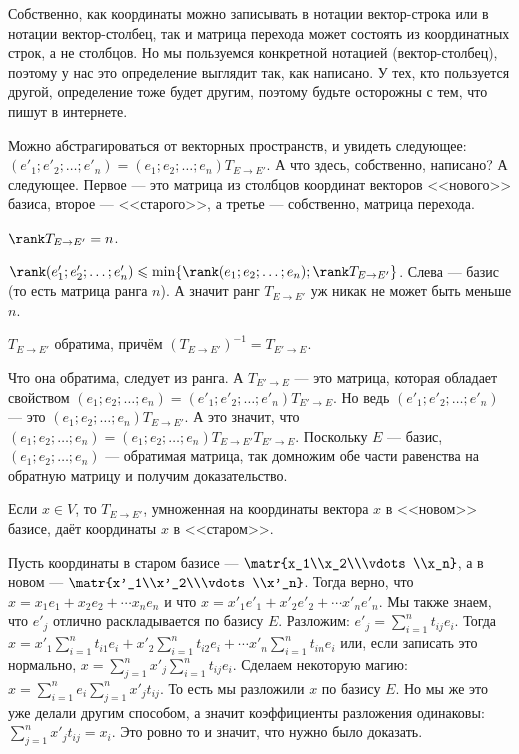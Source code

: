 \documentclass{article}
\begin{document}
\begin{itemize}
        \begin{Comment}
            Собственно, как координаты можно записывать в нотации вектор-строка или в нотации вектор-столбец, так и матрица перехода может состоять из координатных строк, а не столбцов. Но мы пользуемся конкретной нотацией (вектор-столбец), поэтому у нас это определение выглядит так, как написано. У тех, кто пользуется другой, определение тоже будет другим, поэтому будьте осторожны с тем, что пишут в интернете.
        \end{Comment}
        \begin{Comment}
            Можно абстрагироваться от векторных пространств, и увидеть следующее: $(e'_1;e'_2;\ldots;e'_n)=(e_1;e_2;\ldots;e_n)T_{E\to E'}$. А что здесь, собственно, написано? А следующее. Первое --- это матрица из столбцов координат векторов <<нового>> базиса, второе --- <<старого>>, а третье --- собственно, матрица перехода.
        \end{Comment}
        \thm $\rank T_{E\to E'}=n$.
        \begin{Proof}
            $\rank(e'_1;e'_2;\ldots;e'_n)\leqslant\min\{\rank(e_1;e_2;\ldots;e_n);\rank T_{E\to E'}\}$. Слева --- базис (то есть матрица ранга $n$). А значит ранг $T_{E\to E'}$ уж никак не может быть меньше $n$.
        \end{Proof}
        \thm $T_{E\to E'}$ обратима, причём $(T_{E\to E'})^{-1}=T_{E'\to E}$.
        \begin{Proof}
            Что она обратима, следует из ранга. А $T_{E'\to E}$ --- это матрица, которая обладает свойством $(e_1;e_2;\ldots;e_n)=(e'_1;e'_2;\ldots;e'_n)T_{E'\to E}$. Но ведь $(e'_1;e'_2;\ldots;e'_n)$ --- это $(e_1;e_2;\ldots;e_n)T_{E\to E'}$. А это значит, что $(e_1;e_2;\ldots;e_n)=(e_1;e_2;\ldots;e_n)T_{E\to E'}T_{E'\to E}$. Поскольку $E$ --- базис, $(e_1;e_2;\ldots;e_n)$ --- обратимая матрица, так домножим обе части равенства на обратную матрицу и получим доказательство.
        \end{Proof}
        \thm Если $x\in V$, то $T_{E\to E'}$, умноженная на координаты вектора $x$ в <<новом>> базисе, даёт координаты $x$ в <<старом>>.
        \begin{Proof}
            Пусть координаты в старом базисе --- $\matr{x_1\\x_2\\\vdots\\x_n}$, а в новом --- $\matr{x'_1\\x'_2\\\vdots\\x'_n}$. Тогда верно, что $x=x_1e_1+x_2e_2+\cdots x_ne_n$ и что $x=x'_1e'_1+x'_2e'_2+\cdots x'_ne'_n$. Мы также знаем, что $e'_j$ отлично раскладывается по базису $E$. Разложим: $e'_j=\sum\limits_{i=1}^nt_{ij}e_i$. Тогда $x=x'_1\sum\limits_{i=1}^nt_{i1}e_i+x'_2\sum\limits_{i=1}^nt_{i2}e_i+\cdots x'_n\sum\limits_{i=1}^nt_{in}e_i$ или, если записать это нормально, $x=\sum\limits_{j=1}^nx'_j\sum\limits_{i=1}^nt_{ij}e_i$. Сделаем некоторую магию: $x=\sum\limits_{i=1}^ne_i\sum\limits_{j=1}^nx'_jt_{ij}$. То есть мы разложили $x$ по базису $E$. Но мы же это уже делали другим способом, а значит коэффициенты разложения одинаковы: $\sum\limits_{j=1}^nx'_jt_{ij}=x_i$. Это ровно то и значит, что нужно было доказать.

\end{Proof}
\end{itemize}
\end{document}
